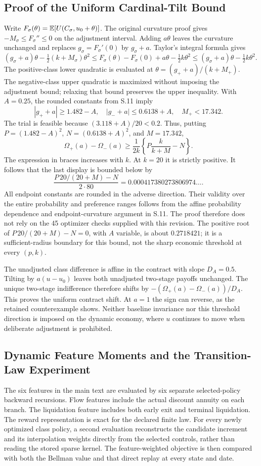 \subsection{Proof of the Uniform Cardinal-Tilt Bound}
Write $F_\sigma(\theta)=\mathbb E[U(C_\sigma,u_0+\theta)]$. The original curvature proof gives $-M_\sigma\leq F_\sigma''\leq0$ on the adjustment interval. Adding $a\theta$ leaves the curvature unchanged and replaces $g_\sigma=F_\sigma'(0)$ by $g_\sigma+a$. Taylor's integral formula gives
\[
 (g_\sigma+a)\theta-\tfrac12(k+M_\sigma)\theta^2
 \leq F_\sigma(\theta)-F_\sigma(0)+a\theta-\tfrac12k\theta^2
 \leq(g_\sigma+a)\theta-\tfrac12k\theta^2.
\]
The positive-class lower quadratic is evaluated at $\theta=(g_++a)/(k+M_+)$. The negative-class upper quadratic is maximized without imposing the adjustment bound; relaxing that bound preserves the upper inequality. With $A=0.25$, the rounded constants from S.11 imply
\[
 |g_++a|\geq1.482-A,\quad |g_-+a|\leq0.6138+A,
 \quad M_+<17.342.
\]
The trial is feasible because $(3.118+A)/20<0.2$. Thus, putting $P=(1.482-A)^2$, $N=(0.6138+A)^2$, and $M=17.342$,
\[
 \Omega_+(a)-\Omega_-(a)
 \geq\frac1{2k}\left\{P\frac{k}{k+M}-N\right\}.
\]
The expression in braces increases with $k$. At $k=20$ it is strictly positive. It follows that the last display is bounded below by
\[
 \frac{P\,20/(20+M)-N}{2\cdot80}
 =0.000417380273806974\ldots.
\]
All endpoint constants are rounded in the adverse direction. Their validity over the entire probability and preference ranges follows from the affine probability dependence and endpoint-curvature argument in S.11. The proof therefore does not rely on the 45 optimizer checks supplied with this revision. The positive root of $P\,20/(20+M)-N=0$, with $A$ variable, is about $0.2718421$; it is a sufficient-radius boundary for this bound, not the sharp economic threshold at every $(p,k)$.

The unadjusted class difference is affine in the contract with slope $D_A=0.5$. Tilting by $a(u-u_0)$ leaves both unadjusted two-stage payoffs unchanged. The unique two-stage indifference therefore shifts by $-(\Omega_+(a)-\Omega_-(a))/D_A$. This proves the uniform contract shift. At $a=1$ the sign can reverse, as the retained counterexample shows. Neither baseline invariance nor this threshold direction is imposed on the dynamic economy, where $u$ continues to move when deliberate adjustment is prohibited.

\subsection{Dynamic Feature Moments and the Transition-Law Experiment}
The six features in the main text are evaluated by six separate selected-policy backward recursions. Flow features include the actual discount annuity on each branch. The liquidation feature includes both early exit and terminal liquidation. The reward representation is exact for the declared finite law. For every newly optimized class policy, a second evaluation reconstructs the candidate increment and its interpolation weights directly from the selected controls, rather than reading the stored sparse kernel. The feature-weighted objective is then compared with both the Bellman value and that direct replay at every state and date.

